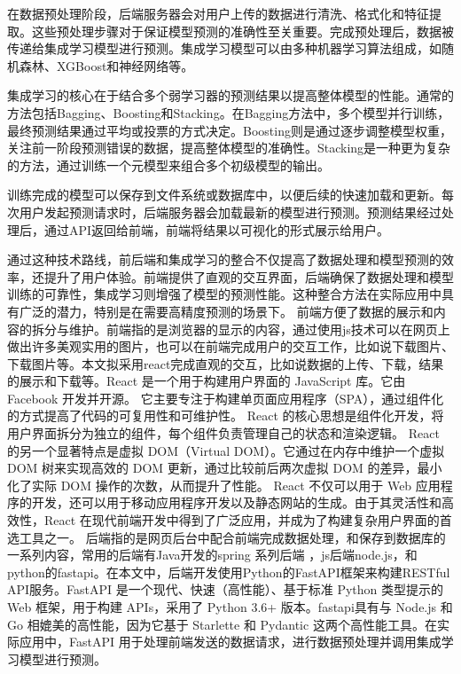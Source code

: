 \documentclass{article}
\begin{document}
	在数据预处理阶段，后端服务器会对用户上传的数据进行清洗、格式化和特征提取。这些预处理步骤对于保证模型预测的准确性至关重要。完成预处理后，数据被传递给集成学习模型进行预测。集成学习模型可以由多种机器学习算法组成，如随机森林、XGBoost和神经网络等。
	
	集成学习的核心在于结合多个弱学习器的预测结果以提高整体模型的性能。通常的方法包括Bagging、Boosting和Stacking。在Bagging方法中，多个模型并行训练，最终预测结果通过平均或投票的方式决定。Boosting则是通过逐步调整模型权重，关注前一阶段预测错误的数据，提高整体模型的准确性。Stacking是一种更为复杂的方法，通过训练一个元模型来组合多个初级模型的输出。
	
	训练完成的模型可以保存到文件系统或数据库中，以便后续的快速加载和更新。每次用户发起预测请求时，后端服务器会加载最新的模型进行预测。预测结果经过处理后，通过API返回给前端，前端将结果以可视化的形式展示给用户。
	
	通过这种技术路线，前后端和集成学习的整合不仅提高了数据处理和模型预测的效率，还提升了用户体验。前端提供了直观的交互界面，后端确保了数据处理和模型训练的可靠性，集成学习则增强了模型的预测性能。这种整合方法在实际应用中具有广泛的潜力，特别是在需要高精度预测的场景下。
	前端方便了数据的展示和内容的拆分与维护。前端指的是浏览器的显示的内容，通过使用js技术可以在网页上做出许多美观实用的图片，也可以在前端完成用户的交互工作，比如说下载图片、下载图片等。本文拟采用react完成直观的交互，比如说数据的上传、下载，结果的展示和下载等。React 是一个用于构建用户界面的 JavaScript 库。它由 Facebook 开发并开源。
	它主要专注于构建单页面应用程序（SPA），通过组件化的方式提高了代码的可复用性和可维护性。 React 的核心思想是组件化开发，将用户界面拆分为独立的组件，每个组件负责管理自己的状态和渲染逻辑。 React 的另一个显著特点是虚拟 DOM（Virtual DOM）。它通过在内存中维护一个虚拟 DOM 树来实现高效的 DOM 更新，通过比较前后两次虚拟 DOM 的差异，最小化了实际 DOM 操作的次数，从而提升了性能。 React 不仅可以用于 Web 应用程序的开发，还可以用于移动应用程序开发以及静态网站的生成。由于其灵活性和高效性，React 在现代前端开发中得到了广泛应用，并成为了构建复杂用户界面的首选工具之一。
	后端指的是网页后台中配合前端完成数据处理，和保存到数据库的一系列内容，常用的后端有Java开发的spring 系列后端 ，js后端node.js，和python的fastapi。在本文中，后端开发使用Python的FastAPI框架来构建RESTful API服务。FastAPI 是一个现代、快速（高性能）、基于标准 Python 类型提示的 Web 框架，用于构建 APIs，采用了 Python 3.6+ 版本。fastapi具有与 Node.js 和 Go 相媲美的高性能，因为它基于 Starlette 和 Pydantic 这两个高性能工具。在实际应用中，FastAPI 用于处理前端发送的数据请求，进行数据预处理并调用集成学习模型进行预测。
	
\end{document}
